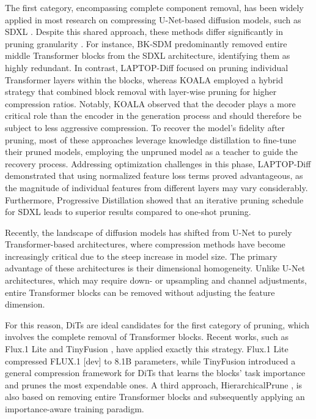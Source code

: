  The first category, encompassing complete component removal, has been widely applied in most research on compressing U-Net-based diffusion models, such as SDXL \cite{SDXL}. Despite this shared approach, these methods differ significantly in pruning granularity \cite{Koala,Laptop,Bksdm,ProgressiveDistillation,tang2023lightweight}. For instance, BK-SDM \cite{Bksdm} predominantly removed entire middle Transformer blocks from the SDXL architecture, identifying them as highly redundant. In contrast, LAPTOP-Diff \cite{Laptop} focused on pruning individual Transformer layers within the blocks, whereas KOALA \cite{Koala} employed a hybrid strategy that combined block removal with layer-wise pruning for higher compression ratios. Notably, KOALA observed that the decoder plays a more critical role than the encoder in the generation process and should therefore be subject to less aggressive compression.
 To recover the model's fidelity after pruning, most of these approaches leverage knowledge distillation \cite{KnowledgeDistillation} to fine-tune their pruned models, employing the unpruned model as a teacher to guide the recovery process. Addressing optimization challenges in this phase, LAPTOP-Diff \cite{Laptop} demonstrated that using normalized feature loss terms proved advantageous, as the magnitude of individual features from different layers may vary considerably. Furthermore, Progressive Distillation \cite{ProgressiveDistillation} showed that an iterative pruning schedule for SDXL leads to superior results compared to one-shot pruning. 
 
 Recently, the landscape of diffusion models has shifted from U-Net to purely Transformer-based architectures, where compression methods have become increasingly critical due to the steep increase in model size. The primary advantage of these architectures is their dimensional homogeneity. Unlike U-Net architectures, which may require down- or upsampling and channel adjustments, entire Transformer blocks can be removed without adjusting the feature dimension. 
 
 For this reason, \gls{DiT}s are ideal candidates for the first category of pruning, which involves the complete removal of Transformer blocks. Recent works, such as Flux.1 Lite \cite{flux1-lite} and TinyFusion \cite{TinyFusion}, have applied exactly this strategy. Flux.1 Lite compressed FLUX.1 [dev] to 8.1B parameters, while TinyFusion introduced a general compression framework for \gls{DiT}s that learns the blocks' task importance and prunes the most expendable ones. A third approach, HierarchicalPrune \cite{HierarchicalPrune}, is also based on removing entire Transformer blocks and subsequently applying an importance-aware training paradigm. 
 
